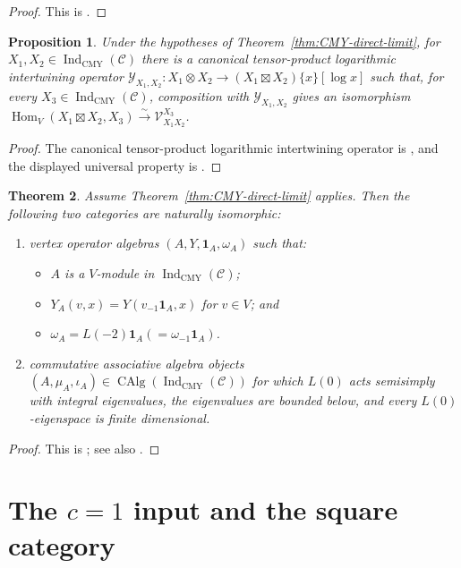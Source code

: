 \documentclass[12pt,leqno]{amsart}
\numberwithin{equation}{section} \newtheorem{thm}{Theorem}[section] \newtheorem{lem}[thm]{Lemma} \newtheorem{ex}[thm]{Example} \newtheorem{prop}[thm]{Proposition} \newtheorem{cor}[thm]{Corollary} \newtheorem{defi}[thm]{Definition} \newtheorem{rmk}[thm]{Remark} \newtheorem{notation}[thm]{Notation}
\newcommand{\one}{\mathbf{1}}
\newcommand{\Hom}{\operatorname{Hom}}
\newcommand{\CAlg}{\operatorname{CAlg}}
\newcommand{\IndCMY}{\operatorname{Ind}_{\mathrm{CMY}}}
\begin{document}
\begin{proof}
This is \cite[Corollary~2.14]{CMY}.
\end{proof}

\begin{prop}
\label{prop:CMY-tensor-universal}
Under the hypotheses of Theorem~\ref{thm:CMY-direct-limit}, for $X_1,X_2\in\IndCMY(\mathcal C)$ there is a canonical tensor-product logarithmic intertwining operator \(\mathcal Y_{X_1,X_2}:X_1\otimes X_2\longrightarrow(X_1\boxtimes X_2)\{x\}[\log x]\) such that, for every $X_3\in\IndCMY(\mathcal C)$, composition with $\mathcal Y_{X_1,X_2}$ gives an isomorphism \(\Hom_V(X_1\boxtimes X_2,X_3)\overset{\sim}{\longrightarrow}\mathcal V^{X_3}_{X_1 X_2}\).
\end{prop}

\begin{proof}
The canonical tensor-product logarithmic intertwining operator is \cite[Theorem~6.1(1)]{CMY}, and the displayed universal property is \cite[Theorem~6.1(2)]{CMY}.
\end{proof}

\begin{thm}
\label{thm:CMY-extension}
Assume Theorem~\ref{thm:CMY-direct-limit} applies. Then the following two categories are naturally isomorphic:
\begin{enumerate}[label=\textnormal{(\arabic*)}]
\item vertex operator algebras $(A,Y,\one_A,\omega_A)$ such that:
\begin{itemize}
\item $A$ is a $V$-module in $\IndCMY(\mathcal C)$;
\item $Y_A(v,x)=Y(v_{-1}\one_A,x)$ for $v\in V$; and
\item $\omega_A=L(-2)\one_A(=\omega_{-1}\one_A)$.
\end{itemize}
\item commutative associative algebra objects
\((A,\mu_A,\iota_A)\in\CAlg(\IndCMY(\mathcal C))\) for which $L(0)$ acts semisimply with integral eigenvalues, the eigenvalues are bounded below, and every $L(0)$-eigenspace is finite dimensional.
\end{enumerate}
\end{thm}

\begin{proof}
This is \cite[Theorem~7.5]{CMY}; see also \cite[Theorem~1.3]{CMY}.
\end{proof}

\section{The \texorpdfstring{$c=1$}{c=1} input and the square category}\label{sec:prelim}
\end{document}
